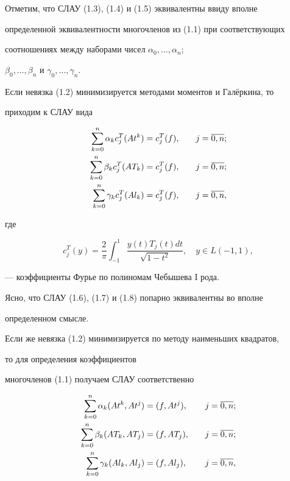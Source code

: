 Отметим, что СЛАУ (1.3), (1.4) и (1.5) эквивалентны ввиду вполне 


определенной эквивалентности многочленов из (1.1) при соответствующих 


соотношениях между наборами чисел $\alpha_0,\dots,\alpha_n$;


$\beta_0,\dotsc,\beta_n$ и $\gamma_0,\dotsc,\gamma_n$.





Если невязка (1.2) минимизируется методами моментов и Гал\"еркина, то 


приходим к СЛАУ вида


\begin{alignat}{2}


\suml_{k=0}^n\alpha_k c_j^T (At^k) &= c_j^T(f),&\quad j&=\ol{0,n};\\


%


\suml_{k=0}^n \beta_k c_j^T (AT_k) &= c_j^T(f),&\quad j&=\ol{0,n};\\


%


\suml_{k=0}^n \gamma_k c_j^T(Al_k) &= c_j^T(f),&\quad j&=\ol{0,n},


\end{alignat}


где


$$


c_j^T(y) = \frac{2}{\pi}\int_{-1}^{1}\frac{y(t)T_j(t)dt}{\sqrt{1-t^2}},


\quad y\in L(-1,1),


$$


--- коэффициенты Фурье по полиномам Чебышева I рода.





Ясно, что СЛАУ (1.6), (1.7) и (1.8) попарно эквивалентны во вполне 


определенном смысле.





Если же невязка (1.2) минимизируется по методу наименьших квадратов, 


то для определения коэффициентов


многочленов (1.1) получаем СЛАУ соответственно


\begin{alignat}{2}


\suml_{k=0}^n\alpha_k(At^k,At^j)&=(f,At^j),&\quad j&=\ol{0,n};\\


%


\suml_{k=0}^n\beta_k(AT_k,AT_j) &= (f,AT_j),&\quad j&=\ol{0,n};\\


%


\suml_{k=0}^n \gamma_k (Al_k,Al_j) &= (f,Al_j),&\quad j&=\ol{0,n},


\end{alignat}


